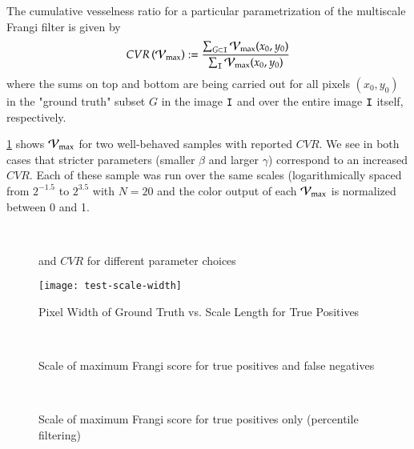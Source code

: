 \begin{defn} The cumulative vesselness ratio for a particular parametrization of the multiscale Frangi filter is given by
	\begin{equation}
	CVR\left(\mathcal{V}_{\max}\right) := \frac{\sum_{G\subset\mathtt{I}} \mathcal{V}_{\max}(x_0, y_0)}{\sum_{\mathtt{I}} \mathcal{V}_{\max}(x_0,y_0)}
	\end{equation}
	where the sums on top and bottom are being carried out for all pixels $(x_0,y_0)$ in the "ground truth" subset $G$ in the image $\mathtt{I}$
	and over the entire image $\mathtt{I}$ itself, respectively.
\end{defn}

\cref{fig:compare_parameters} shows $\mathcal{V}_{\max}$ for two well-behaved samples with reported $CVR$. We see in both cases that stricter parameters (smaller $\beta$ and larger $\gamma$) correspond to an increased $CVR$. Each of these sample was run over the same scales (logarithmically spaced from $2^{-1.5}$ to $2^{3.5}$ with $N=20$ and the color output of each $\mathcal{V}_{\max}$ is normalized between 0 and 1.

\begin{figure}[p]\centering
	\\
	\caption{\Vmax  and $CVR$ for different parameter choices}
	\label{fig:compare_parameters}
\end{figure}

\begin{figure}[p]
  \texttt{[image: test-scale-width]}
  \caption{Pixel Width of Ground Truth vs. Scale Length for True Positives}
\end{figure}

\begin{figure}[p]\centering
  \\[-0.5cm]
  \caption{Scale of maximum Frangi score for true positives and false negatives}
\end{figure}

\begin{figure}[p]\centering
  \\[-0.5cm]
  \caption{Scale of maximum Frangi score for true positives only (percentile filtering)}
\end{figure}
